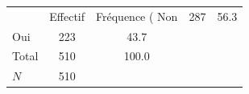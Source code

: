 {
\def\sym#1{\ifmmode^{#1}\else\(^{#1}\)\fi}
\begin{tabular}{l*{1}{cc}}
\toprule
            &    Effectif&Fréquence (%
\midrule
Non         &         287&        56.3\\
Oui         &         223&        43.7\\
Total       &         510&       100.0\\
\midrule
\(N\)       &         510&            \\
\bottomrule
\end{tabular}
}
